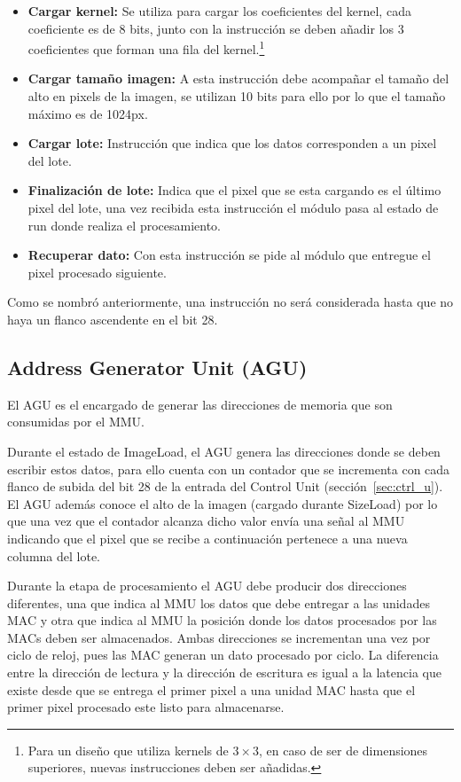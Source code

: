 \begin{itemize}
\item \textbf{Cargar kernel:} Se utiliza para cargar los coeficientes del
  kernel, cada coeficiente es de 8 bits, junto con la instrucción se deben
  añadir los 3 coeficientes que forman una fila del kernel.\footnote{Para un
    diseño que utiliza kernels de $3\times3$, en caso de ser de dimensiones
    superiores, nuevas instrucciones deben ser añadidas.}
\item \textbf{Cargar tamaño imagen:} A esta instrucción debe acompañar el tamaño
  del alto en pixels de la imagen, se utilizan 10 bits para ello por lo que el
  tamaño máximo es de 1024px.
\item \textbf{Cargar lote:} Instrucción que indica que los datos corresponden a
  un pixel del lote.
\item \textbf{Finalización de lote:} Indica que el pixel que se esta cargando es
  el último pixel del lote, una vez recibida esta instrucción el módulo pasa al
  estado de run donde realiza el procesamiento.
\item \textbf{Recuperar dato:} Con esta instrucción se pide al módulo que
  entregue el pixel procesado siguiente.
\end{itemize}

Como se nombró anteriormente, una instrucción no será considerada hasta que no
haya un flanco ascendente en el bit 28.

\subsection{Address Generator Unit (AGU)}

El AGU es el encargado de generar las direcciones de memoria que son
consumidas por el MMU.

Durante el estado de ImageLoad, el AGU genera las direcciones donde se deben
escribir estos datos, para ello cuenta con un contador que se incrementa con
cada flanco de subida del bit 28 de la entrada del Control Unit
(sección~\ref{sec:ctrl_u}). El AGU además conoce el alto de la imagen (cargado
durante SizeLoad) por lo que una vez que el contador alcanza dicho valor envía
una señal al MMU indicando que el pixel que se recibe a continuación pertenece a
una nueva columna del lote.

Durante la etapa de procesamiento el AGU debe producir dos direcciones
diferentes, una que indica al MMU los datos que debe entregar a las unidades MAC
y otra que indica al MMU la posición donde los datos procesados por las MACs
deben ser almacenados. Ambas direcciones se incrementan una vez por ciclo de
reloj, pues las MAC generan un dato procesado por ciclo. La diferencia entre la
dirección de lectura y la dirección de escritura es igual a la latencia que
existe desde que se entrega el primer pixel a una unidad MAC hasta que el primer
pixel procesado este listo para almacenarse.

